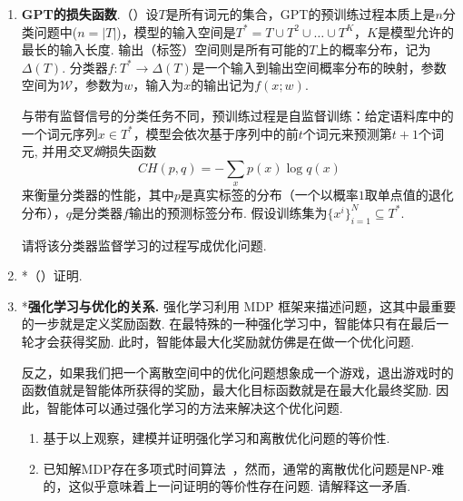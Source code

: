 \begin{enumerate}[wide, labelindent=0pt]
    \item \textbf{GPT的损失函数}.（\cite{radfordImprovingLanguageUnderstanding}）设$T$是所有词元的集合，GPT的预训练过程本质上是$n$分类问题中($n = |T|$)，模型的输入空间是$T^\ast=T\cup T^2 \cup \dots \cup T^K$，$K$是模型允许的最长的输入长度. 输出（标签）空间则是所有可能的$T$上的概率分布，记为$\Delta(T)$. 分类器$f:T^\ast \to \Delta(T)$是一个输入到输出空间概率分布的映射，参数空间为$\mathcal W$，参数为$w$，输入为$x$的输出记为$f(x;w)$. 
    
    与带有监督信号的分类任务不同，预训练过程是自监督训练：给定语料库中的一个词元序列$x \in T^\ast$，模型会依次基于序列中的前$t$个词元来预测第$t+1$个词元, 并用\textit{交叉熵}损失函数
    \[CH(p,q) = -\sum_{x} p(x)\log q(x)\]
    来衡量分类器的性能，其中$p$是真实标签的分布（一个以概率$1$取单点值的退化分布），$q$是分类器$f$输出的预测标签分布. 假设训练集为$\{x^i\}_{i=1}^N\subseteq T^\ast$. 
    
    请将该分类器监督学习的过程写成优化问题.
    \item *\label{exercise:no-free-lunch}（\cite{wolpertNoFreeLunch1997}）证明.
    
    \item *\textbf{强化学习与优化的关系. }强化学习利用 MDP 框架来描述问题，这其中最重要的一步就是定义奖励函数. 在最特殊的一种强化学习中，智能体只有在最后一轮才会获得奖励. 此时，智能体最大化奖励就仿佛是在做一个优化问题. 
    
    反之，如果我们把一个离散空间中的优化问题想象成一个游戏，退出游戏时的函数值就是智能体所获得的奖励，最大化目标函数就是在最大化最终奖励. 因此，智能体可以通过强化学习的方法来解决这个优化问题. 
    
    \begin{enumerate}
        \item 基于以上观察，建模并证明强化学习和离散优化问题的等价性.
        \item 已知解MDP存在多项式时间算法~\cite{littmanComplexitySolvingMarkov1995}，然而，通常的离散优化问题是$\mathsf{NP}$-难的，这似乎意味着上一问证明的等价性存在问题. 请解释这一矛盾.
    \end{enumerate}
    

\end{enumerate}
